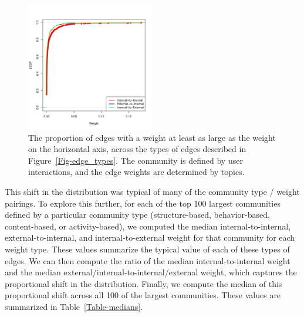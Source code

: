 \begin{figure}[h!]
  \centering
\includegraphics[width=0.50\textwidth]{Figures/comm0_labels-mention-retweet_weights-hashtag-ecdf.pdf}
\caption{The proportion of edges with a weight at least as large as the weight on the horizontal axis, across the types of edges described in Figure~\ref{Fig-edge_types}. The community is defined by user interactions, and the edge weights are determined by topics.}
\label{Fig-dist_across_community}
\end{figure}

This shift in the distribution was typical of many of the community type / weight pairings. To explore this further, for each of the top 100 largest communities defined by a particular community type (structure-based, behavior-based, content-based, or activity-based), we computed the median internal-to-internal, external-to-internal, and internal-to-external weight for that community for each weight type. These values summarize the typical value of each of these types of edges. We can then compute the ratio of the median internal-to-internal weight and the median external/internal-to-internal/external weight, which captures the proportional shift in the distribution. Finally, we compute the median of this proportional shift across all 100 of the largest communities. These values are summarized in Table~\ref{Table-medians}.


